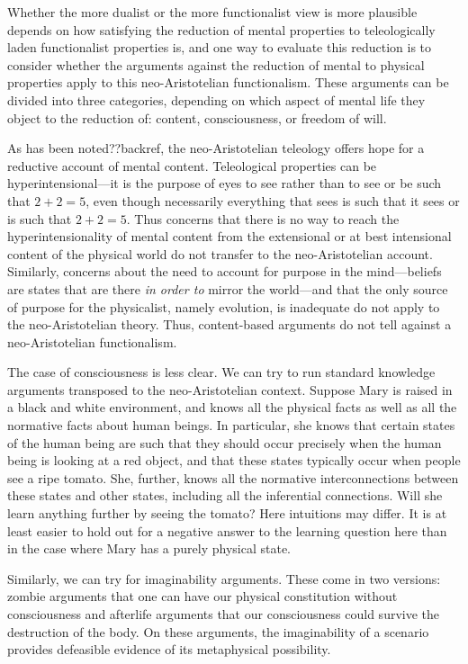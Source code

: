 Whether the more dualist or the more functionalist view is more plausible depends on how satisfying the reduction of mental
properties to teleologically laden functionalist properties is, and one way to evaluate this reduction is to consider
whether the arguments against the reduction of mental to physical properties apply to this neo-Aristotelian functionalism.
These arguments can be divided into three categories, depending on which aspect of mental life they object to the reduction
of: content, consciousness, or freedom of will. 

As has been noted??backref, the neo-Aristotelian teleology offers hope for a reductive account of mental content. Teleological properties
can be hyperintensional---it is the purpose of eyes to see rather than to see or be such that $2+2=5$, even though necessarily
everything that sees is such that it sees or is such that $2+2=5$. Thus concerns that there is no way to reach the hyperintensionality
of mental content from the extensional or at best intensional content of the physical world do not transfer to the neo-Aristotelian
account. Similarly, concerns about the need to account for purpose in the mind---beliefs are states that are there 
\textit{in order to} mirror the world---and that the only source of purpose for the physicalist, namely evolution, is inadequate
do not apply to the neo-Aristotelian theory. Thus, content-based arguments do not tell against a neo-Aristotelian functionalism.

The case of consciousness is less clear. We can try to run standard knowledge arguments transposed to the neo-Aristotelian context.
Suppose Mary is raised in a black and white environment, and knows all the physical facts as well as all the normative facts about
human beings. In particular, she knows that certain states of the human being are such that they should occur precisely when the
human being is looking at a red object, and that these states typically occur when people see a ripe tomato. She, further, knows all
the normative interconnections between these states and other states, including all the inferential connections. Will she learn anything
further by seeing the tomato? Here intuitions may differ. It is at least easier to hold out for a negative answer to the learning question
here than in the case where Mary has a purely physical state.

Similarly, we can try for imaginability arguments. These come in two versions: zombie arguments that one can have our physical
constitution without consciousness and afterlife arguments that our consciousness could survive the destruction of the body.
On these arguments, the imaginability of a scenario provides defeasible evidence of its metaphysical possibility. 

